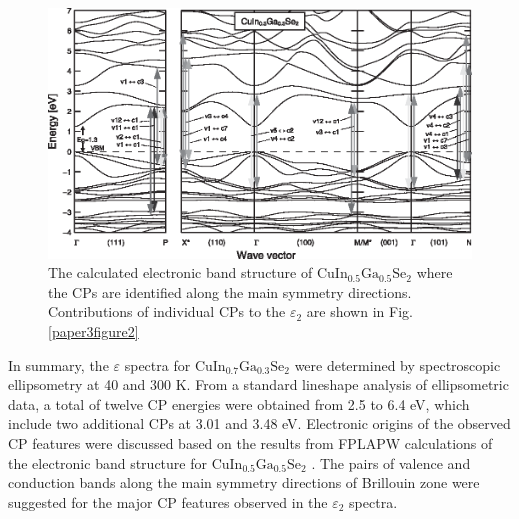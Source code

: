 \documentclass[a4paper, 12pt, titlepage,oneside,drop]{kthesis}
\begin{document}
\begin{figure}[H]
\begin{center}
\includegraphics[scale=.8]{paper3figure3.eps}
\end{center}
\caption{The calculated electronic band structure of $\mathrm {CuIn_{0.5}Ga_{0.5}Se_2}$ where the CPs are identified along the main symmetry directions. Contributions of individual CPs to the $\varepsilon_2$ are shown in Fig. \ref{paper3figure2}}
\label{paper3figure3}
\end{figure} 




In summary, the  $\varepsilon$ spectra for $\mathrm {CuIn_{0.7}Ga_{0.3}Se_2}$ were determined by spectroscopic ellipsometry at 40 and 300 K. From a standard lineshape analysis of ellipsometric data,
 a total of twelve CP energies were obtained from 2.5 to 6.4 eV, which include two additional CPs at 3.01 and 3.48 eV. Electronic origins of the observed CP features
 were discussed based on the results from FPLAPW calculations of the electronic band structure for $\mathrm {CuIn_{0.5}Ga_{0.5}Se_2}$ . The pairs of valence and conduction bands along 
the main symmetry directions of Brillouin zone were suggested for the major CP features observed in the $\varepsilon_2$ spectra.
\end{document}
